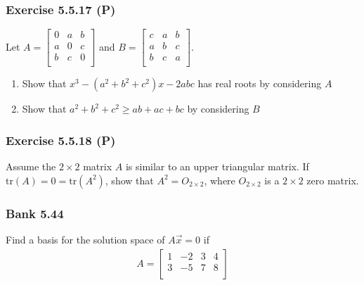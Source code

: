 \documentclass[pdf,9pt,t]{beamer}
\begin{document}
\begin{frame}[fragile]
    \frametitle{Exercise 5.5.17 (P)}
    \begin{problem}
	Let $A=\begin{bmatrix}
	    0 & a & b\\
	    a & 0 & c\\
	    b & c & 0\\
	    \end{bmatrix}$ 
	and $B=\begin{bmatrix}
	    c & a & b\\
	    a & b & c\\
	    b & c & a\\
	    \end{bmatrix}$.
	\begin{enumerate}
	    \item Show that $x^3-(a^2+b^2+c^2)x-2abc$ has real roots by considering $A$
	    \item Show that $a^2+b^2+c^2\ge ab+ac+bc$ by considering $B$
	\end{enumerate}
    \end{problem}
\end{frame}
\begin{frame}[fragile]
    \frametitle{Exercise 5.5.18 (P)}
    \begin{problem}
	Assume the $2\times 2$ matrix $A$ is similar to an upper triangular matrix. If $\text{tr}(A)=0=\text{tr}(A^2)$,
	show that $A^2=O_{2\times 2}$, where $O_{2\times 2}$ is a $2\times 2$ zero matrix.
    \end{problem}
\end{frame}
\begin{frame}[fragile]
    \frametitle{Bank 5.44}
    \begin{problem}
	Find a basis for the solution space of $A \vec{x}=0 $ if 
	\begin{align*}
	    A = \begin{bmatrix} 1 & -2 & 3 & 4\\ 3 & -5 & 7 & 8\\ \end{bmatrix}
	\end{align*}
    \end{problem}
\end{frame}
\end{document}
